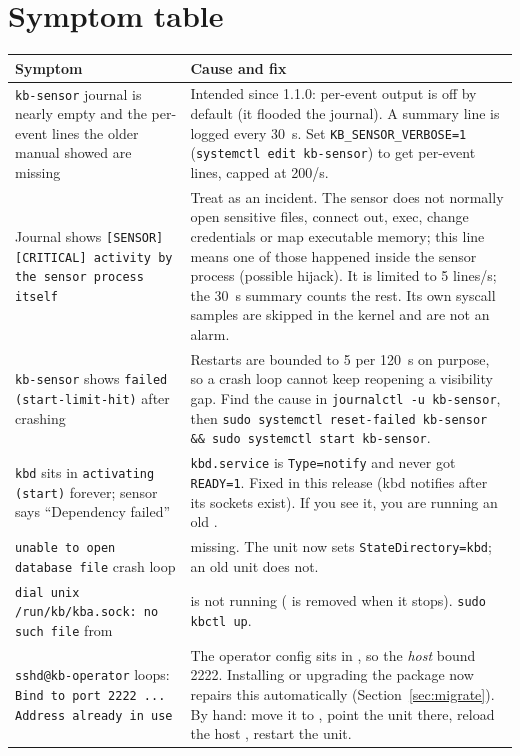 \section{Symptom table}
\begin{center}\small
\begin{tabularx}{\textwidth}{@{}L{4.5cm}Y@{}}
\toprule
\textbf{Symptom} & \textbf{Cause and fix}\\
\midrule
\texttt{kb-sensor} journal is nearly empty and the per-event lines the older manual showed are missing & Intended since 1.1.0: per-event output is off by default (it flooded the journal). A summary line is logged every 30~s. Set \texttt{KB\_SENSOR\_VERBOSE=1} (\texttt{systemctl edit kb-sensor}) to get per-event lines, capped at 200/s.\\
Journal shows \texttt{[SENSOR][CRITICAL] activity by the sensor process itself} & Treat as an incident. The sensor does not normally open sensitive files, connect out, exec, change credentials or map executable memory; this line means one of those happened inside the sensor process (possible hijack). It is limited to 5 lines/s; the 30~s summary counts the rest. Its own syscall samples are skipped in the kernel and are not an alarm.\\
\texttt{kb-sensor} shows \texttt{failed (start-limit-hit)} after crashing & Restarts are bounded to 5 per 120~s on purpose, so a crash loop cannot keep reopening a visibility gap. Find the cause in \texttt{journalctl -u kb-sensor}, then \texttt{sudo systemctl reset-failed kb-sensor \&\& sudo systemctl start kb-sensor}.\\
\texttt{kbd} sits in \texttt{activating (start)} forever; sensor says ``Dependency failed'' & \texttt{kbd.service} is \texttt{Type=notify} and never got \texttt{READY=1}. Fixed in this release (kbd notifies after its sockets exist). If you see it, you are running an old .\\
\texttt{unable to open database file} crash loop &  missing. The unit now sets \texttt{StateDirectory=kbd}; an old unit does not.\\
\texttt{dial unix /run/kb/kba.sock: no such file} from  &  is not running ( is removed when it stops). \texttt{sudo kbctl up}.\\
\texttt{sshd@kb-operator} loops: \texttt{Bind to port 2222 ... Address already in use} & The operator config sits in , so the \emph{host}  bound 2222. Installing or upgrading the package now repairs this automatically (Section~\ref{sec:migrate}). By hand: move it to , point the unit there, reload the host , restart the unit.\\

\end{tabularx}
\end{center}
